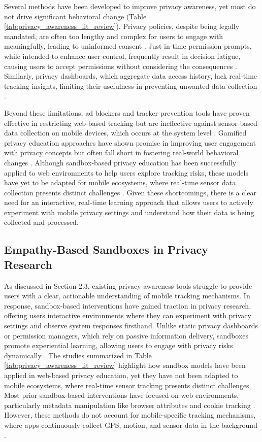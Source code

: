 \documentclass[acmlarge, nonacm]{acmart}
\begin{document}
Several methods have been developed to improve privacy awareness, yet most do not drive significant behavioral change (Table \ref{tab:privacy_awareness_lit_review}). Privacy policies, despite being legally mandated, are often too lengthy and complex for users to engage with meaningfully, leading to uninformed consent \cite{burkhardt2023privacy}. Just-in-time permission prompts, while intended to enhance user control, frequently result in decision fatigue, causing users to accept permissions without considering the consequences \cite{bilogrevic2021shhh}. Similarly, privacy dashboards, which aggregate data access history, lack real-time tracking insights, limiting their usefulness in preventing unwanted data collection \cite{narayanan2024real}.

Beyond these limitations, ad blockers and tracker prevention tools have proven effective in restricting web-based tracking but are ineffective against sensor-based data collection on mobile devices, which occurs at the system level \cite{bian2021supply}. Gamified privacy education approaches have shown promise in improving user engagement with privacy concepts but often fall short in fostering real-world behavioral changes \cite{idierukevbe2024bridging}. Although sandbox-based privacy education has been successfully applied to web environments to help users explore tracking risks, these models have yet to be adapted for mobile ecosystems, where real-time sensor data collection presents distinct challenges \cite{Chaoran2023EmpathySandbox}. Given these shortcomings, there is a clear need for an interactive, real-time learning approach that allows users to actively experiment with mobile privacy settings and understand how their data is being collected and processed.

\subsection{Empathy-Based Sandboxes in Privacy Research}
As discussed in Section 2.3, existing privacy awareness tools struggle to provide users with a clear, actionable understanding of mobile tracking mechanisms. In response, sandbox-based interventions have gained traction in privacy research, offering users interactive environments where they can experiment with privacy settings and observe system responses firsthand. Unlike static privacy dashboards or permission managers, which rely on passive information delivery, sandboxes promote experiential learning, allowing users to engage with privacy risks dynamically \cite{Chaoran2023EmpathySandbox}. The studies summarized in Table \ref{tab:privacy_awareness_lit_review} highlight how sandbox models have been applied in web-based privacy education, yet they have not been adapted to mobile ecosystems, where real-time sensor tracking presents distinct challenges. Most prior sandbox-based interventions have focused on web environments, particularly metadata manipulation like browser attributes and cookie tracking \cite{van2024we}. However, these methods do not account for mobile-specific tracking mechanisms, where apps continuously collect GPS, motion, and sensor data in the background \cite{bella}.
\end{document}

